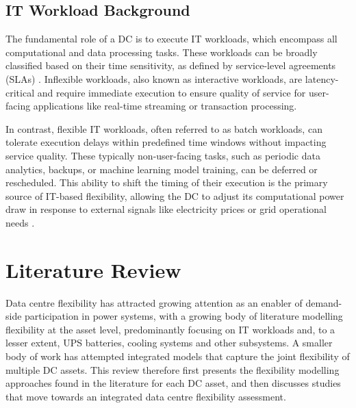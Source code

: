 \documentclass[lettersize,journal]{IEEEtran}
\newcommand{\rev}[1]{#1}
\begin{document}
\subsection{IT Workload Background}
The fundamental role of a DC is to execute IT workloads, which encompass all computational and data processing tasks. These workloads can be broadly classified based on their time sensitivity, as defined by service-level agreements (SLAs) \cite{Liu2024Access,Cao2022ApEn}. Inflexible workloads, also known as interactive workloads, are latency-critical and require immediate execution to ensure quality of service for user-facing applications like real-time streaming or transaction processing.

In contrast, flexible IT workloads, often referred to as batch workloads, can tolerate execution delays within predefined time windows without impacting service quality. These typically non-user-facing tasks, such as periodic data analytics, backups, or machine learning model training, can be deferred or rescheduled. This ability to shift the timing of their execution is the primary source of IT-based flexibility, allowing the DC to adjust its computational power draw in response to external signals like electricity prices or grid operational needs \cite{Cao2022ApEn}.

\section{Literature Review}

\rev{Data centre flexibility has attracted growing attention as an enabler of demand-side participation in power systems, with a growing body of literature modelling flexibility at the asset level, predominantly focusing on IT workloads and, to a lesser extent, UPS batteries, cooling systems and other subsystems. A smaller body of work has attempted integrated models that capture the joint flexibility of multiple DC assets. This review therefore first presents the flexibility modelling approaches found in the literature for each DC asset, and then discusses studies that move towards an integrated data centre flexibility assessment.}
\end{document}
